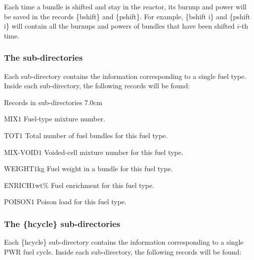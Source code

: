 Each time a bundle is shifted and stay in the reactor, its burnup and power will be saved
in the records \{bshift\} and \{pshift\}. For example, \{bshift i\} and \{pshift i\} will
contain all the burnups and powers of bundles that have been shifted $i$-th time.

\subsubsection{The  sub-directories}\label{sect:dirfuel}

Each  sub-directory contains the information corresponding
to a single fuel type. Inside each sub-directory, the following records
will be found:

\begin{DescriptionEnregistrement}{Records in  sub-directories}
{7.0cm} \label{tabl:tabfuel}

\IntEnr
 {MIX}{$1$} {Fuel-type mixture number.}

\IntEnr
 {TOT}{$1$} {Total number of fuel bundles for this fuel type.}

\IntEnr
 {MIX-VOID}{$1$} {Voided-cell mixture number for this fuel type.}

\RealEnr
{WEIGHT}{$1$}{kg}
{Fuel weight in a bundle for this fuel type.}

\RealEnr
{ENRICH}{$1$}{wt\%}
{Fuel enrichment for this fuel type.}

\RealEnr
{POISON}{$1$}{}
{Poison load for this fuel type.}

\end{DescriptionEnregistrement}

\subsubsection{The \{hcycle\} sub-directories}\label{sect:dirhcycle}

Each \{hcycle\} sub-directory contains the information corresponding
to a single PWR fuel cycle. Inside each sub-directory, the following records
will be found:


